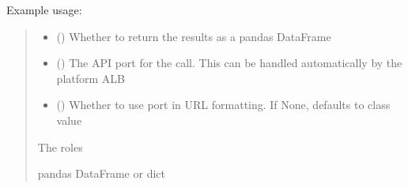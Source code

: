 \documentclass[letterpaper,10pt,english]{sphinxmanual}
\begin{document}
\begin{fulllineitems}
\begin{fulllineitems}
\sphinxAtStartPar
Example usage:

\begin{sphinxVerbatim}[commandchars=\\\{\}]
 
  
\end{sphinxVerbatim}
\begin{quote}\begin{description}
\begin{itemize}
\item {} 
\sphinxAtStartPar
{} (\sphinxstyleliteralemphasis{\sphinxupquote{ (}}\sphinxstyleliteralemphasis{\sphinxupquote{)}}) \textendash{} Whether to return the results as a pandas DataFrame

\item {} 
\sphinxAtStartPar
{} (\sphinxstyleliteralemphasis{\sphinxupquote{ (}}\sphinxstyleliteralemphasis{\sphinxupquote{)}}) \textendash{} The API port for the call. This can be handled automatically by the platform ALB

\item {} 
\sphinxAtStartPar
{} (\sphinxstyleliteralemphasis{\sphinxupquote{ (}}\sphinxstyleliteralemphasis{\sphinxupquote{)}}) \textendash{} Whether to use port in URL formatting. If None, defaults to class value

\end{itemize}

\sphinxAtStartPar
{} \textendash{} The roles

\sphinxAtStartPar
pandas DataFrame or dict


\end{description}
\end{quote}
\end{fulllineitems}
\end{fulllineitems}
\end{document}
